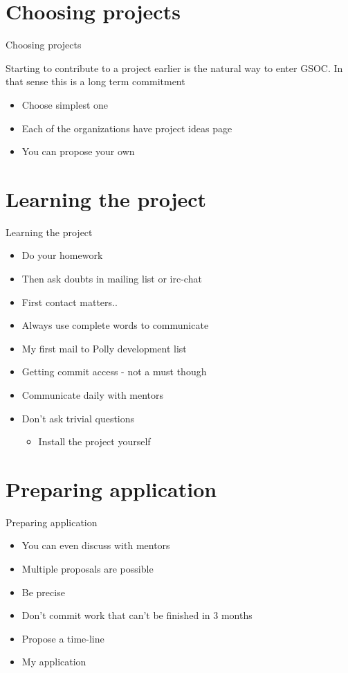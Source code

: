 \documentclass{beamer}
\begin{document}
\section{Choosing projects}
\begin{frame}{Choosing projects}
\begin{block}
{Starting to contribute to a project earlier is the natural way to enter GSOC.
In that sense this is a long term commitment}
\end{block}
\begin{itemize}
\item Choose simplest one
\item Each of the organizations have project ideas page
\item You can propose your own
\end{itemize}
\end{frame}

\section{Learning the project}
\begin{frame}{Learning the project}
\begin{itemize}
\item Do your homework
\pause
\item Then ask doubts in mailing list or irc-chat
\pause
\item First contact matters..
\pause
\item Always use complete words to communicate
\pause
\item My first mail to Polly development list
\pause
\item Getting commit access - not a must though
\pause
\item Communicate daily with mentors
\pause
\item Don't ask trivial questions
  \begin{itemize}
  \item Install the project yourself
  \end{itemize}
\end{itemize}
\end{frame}

\section{Preparing application}
\begin{frame}{Preparing application}
\begin{itemize}
\item You can even discuss with mentors
\pause
\item Multiple proposals are possible
\pause
\item Be precise
\pause
\item Don't commit work that can't be finished in 3 months
\pause
\item Propose a time-line
\pause
\item My application
\end{itemize}
\end{frame}
\end{document}
